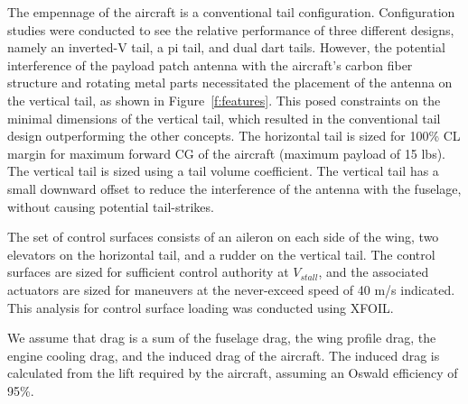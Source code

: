 \documentclass[journal]{aiaa-tc}%
\begin{document}
The empennage of the aircraft is a conventional tail configuration. Configuration studies were conducted to see the relative performance of three different designs, namely an inverted-V tail, a pi tail, and dual dart tails. However, the potential interference of the payload patch antenna with the aircraft's carbon fiber structure and rotating metal parts necessitated the placement of the antenna on the vertical tail, as shown in Figure~\ref{f:features}. This posed constraints on the minimal dimensions of the vertical tail, which resulted in the conventional tail design outperforming the other concepts. The horizontal tail is sized for 100\% CL margin for maximum forward CG of the aircraft (maximum payload of 15 lbs). The vertical tail is sized using a tail volume coefficient. The vertical tail has a small downward offset to reduce the interference of the antenna with the fuselage, without causing potential tail-strikes. 
     
The set of control surfaces consists of an aileron on each side of the wing, two elevators on the horizontal tail, and a rudder on the vertical tail. The control surfaces are sized for sufficient control authority at $V_{stall}$, and the associated actuators are sized for maneuvers at the never-exceed speed of 40 m/s indicated.  This analysis for control surface loading was conducted using XFOIL\cite{XFOIL}. 

We assume that drag is a sum of the fuselage drag, the wing profile drag, the engine cooling drag, and the induced drag of the aircraft.  The induced drag is calculated from the lift required by the aircraft, assuming an Oswald efficiency of 95\%.
\end{document}
